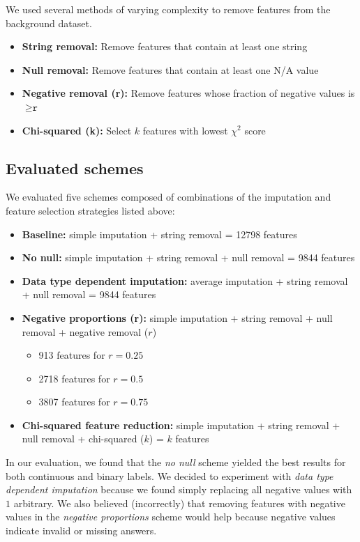 \documentclass{article} %
\begin{document}
We used several methods of varying complexity to remove features from the background dataset.

\begin{itemize}
  \item \textbf{String removal:} Remove features that contain at least one string
  \item \textbf{Null removal:} Remove features that contain at least one N/A value
  \item \textbf{Negative removal (r):} Remove features whose fraction of negative values is $\geq \texttt{r}$
  \item \textbf{Chi-squared (k):} Select $k$ features with lowest $\chi^2$ score
\end{itemize}

\subsection{Evaluated schemes}
\label{sec:evaluatedschemes}

We evaluated five schemes composed of combinations of the imputation and feature selection strategies listed above:

\begin{itemize}
  \item \textbf{Baseline:} simple imputation + string removal = 12798 features
  \item \textbf{No null:} simple imputation + string removal + null removal = 9844 features
  \item \textbf{Data type dependent imputation:} average imputation + string removal + null removal = 9844 features
  \item \textbf{Negative proportions (r):} simple imputation + string removal + null removal + negative removal ($r$)
    \begin{itemize}
      \itemsep0em
      \item{913 features for $r = 0.25$}
      \item{2718 features for $r = 0.5$}
      \item{3807 features for $r = 0.75$}
    \end{itemize}
  \item \textbf{Chi-squared feature reduction:} simple imputation + string removal + null removal + chi-squared ($k$) = $k$ features
\end{itemize}

In our evaluation, we found that the \textit{no null} scheme yielded the best results for both continuous and binary labels. We decided to experiment with \textit{data type dependent imputation} because we found simply replacing all negative values with $1$ arbitrary. We also believed (incorrectly) that removing features with negative values in the \textit{negative proportions} scheme would help because negative values indicate invalid or missing answers.
\end{document}
